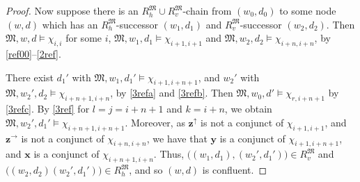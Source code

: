 \documentclass[10pt,a4paper]{amsart}
\theoremstyle{plain}
\theoremstyle{definition}
\newcommand{\bbvarup}{\Zvar^\uparrow}
\newcommand{\bbvarright}{\Zvar^\to}
\newcommand{\fform}[1]{\boldsymbol{#1}}
\newcommand{\xvar}{\fform{x}}
\newcommand{\yvar}{\fform{y}}
\newcommand{\ovar}{\fform{o}}
\newcommand{\Zvar}{\fform{z}}
\newcommand{\Bv}{\forall}
\newcommand{\Bh}{\Box}
\newcommand{\Dv}{\exists}
\begin{document}
\begin{proof}
		Now suppose there is an $R_{h}^\mathfrak M\cup R_{v}^\mathfrak M$-chain from $(w_0,d_0)$
		to some node $(w,d)$ which has an $R_{h}^\mathfrak M$-successor $(w_{1},d_{1})$ and $R_{v}^\mathfrak M$-successor $(w_{2},d_{2})$. Then $\mathfrak M,w,d\models \chi_{i,i}$ for some $i$, 
		$\mathfrak M,w_{1},d_{1}\models \chi_{i+1,i+1}$ and $\mathfrak M,w_{2},d_{2}\models \chi_{i+n,i+n}$, by \eqref{ref00}--\eqref{2ref}.
		
		
		There exist $d_{1}'$ with $\mathfrak M,w_{1},d_{1}'\models \chi_{i+1,i+n+1}$, and $w_{2}'$ with $\mathfrak M,w_{2}',d_{2}\models \chi_{i+n+1,i+n}$, by \eqref{3refa} and \eqref{3refb}.
		Then $\mathfrak M,w_0,d'\models\chi_{r,i+n+1}$ by \eqref{3refc}.
		By \eqref{3ref} for $l=j=i+n+1$ and $k=i+n$,
		we obtain $\mathfrak M,w_{2}',d_{1}'\models \chi_{i+n+1,i+n+1}$.	
		Moreover, as $\bbvarup$ is not a conjunct of $\chi_{i+1,i+1}$, and $\bbvarright$ is not a conjunct of $\chi_{i+n,i+n}$, we have that $\yvar$ is a conjunct of $\chi_{i+1,i+n+1}$, and 
		$\xvar$ is a conjunct of $\chi_{i+n+1,i+n}$. Thus, 
		$\bigl((w_{1},d_{1}),(w_{2}',d_{1}')\bigr)\in R_{v}^\mathfrak M$ and $\bigl((w_{2},d_{2})(w_{2}',d_{1}')\bigr)\in R_{h}^\mathfrak M$,
		and so $(w,d)$ is confluent.
		

\end{proof}
\end{document}
